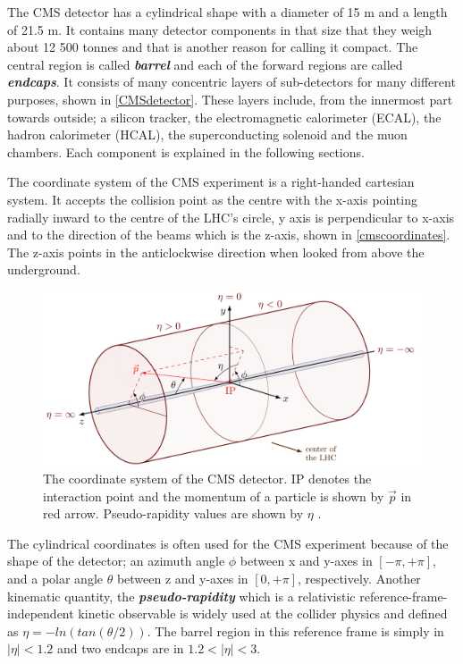 The CMS detector has a cylindrical shape with a diameter of 15 m and a length of 21.5 m. It contains many detector components in that size that they weigh about 12 500 tonnes and that is another reason for calling it compact. The central region is called \textbf{\emph{barrel}} and each of the forward regions are called \textbf{\emph{endcaps}}. It consists of many concentric layers of sub-detectors for many different purposes, shown in \autoref{CMSdetector}. These layers include, from the innermost part towards outside; a silicon tracker, the electromagnetic calorimeter (ECAL), the hadron calorimeter (HCAL), the superconducting solenoid and the muon chambers. Each component is explained in the following sections. 

The coordinate system of the CMS experiment is a right-handed cartesian system. It accepts the collision point as the centre with the x-axis pointing radially inward to the centre of the LHC's circle, y axis is perpendicular to x-axis and to the direction of the beams which is the z-axis, shown in \autoref{cmscoordinates}. The z-axis points in the anticlockwise direction when looked from above the underground. 

\begin{figure}[ht]
	\centering
	\includegraphics[width=\textwidth]{MSc_Thesis/fig/cmscoordinates.png}
	\vspace{2mm}
	\caption[The coordinate system of the CMS detector. IP denotes the interaction point and the momentum of a particle is shown by $\vec{p}$ in red arrow. Pseudo-rapidity values are shown by $\eta$.]{The coordinate system of the CMS detector. IP denotes the interaction point and the momentum of a particle is shown by $\vec{p}$ in red arrow. Pseudo-rapidity values are shown by $\eta$ \cite{cmscoordinates}.}
	\label{cmscoordinates}
\end{figure}

The cylindrical coordinates is often used for the CMS experiment because of the shape of the detector; an azimuth angle $\phi$ between x and y-axes in $\left[-\pi,+\pi\right]$, and a polar angle $\theta$ between z and y-axes in $\left[0,+\pi\right]$, respectively. Another kinematic quantity, the \textbf{\emph{pseudo-rapidity}} which is a relativistic reference-frame-independent kinetic observable is widely used at the collider physics and defined as $\eta = -ln\left(tan\left(\theta/2\right)\right)$. The barrel region in this reference frame is simply in $|\eta|<1.2$ and two endcaps are in $1.2<|\eta|<3$.

